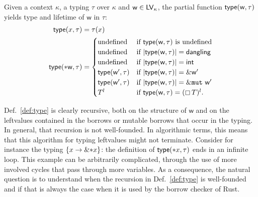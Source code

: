 \begin{definition}\label{def:type}
  Given a context $\kappa$, a typing $\tau$ over $\kappa$
  and $\mathsf{w}\in\mathsf{LV}_\kappa$, the partial function
  $\mathsf{type}(\mathsf{w},\tau)$ yields type and lifetime of $\mathsf{w}$ in $\tau$:
  \begin{align*}
    \mathsf{type}(x,\tau)&=\tau(x)\\
    \mathsf{type}(*\mathsf{w},\tau)&=\begin{cases}
    \text{undefined} & \text{if $\mathsf{type}(\mathsf{w},\tau)$ is undefined}\\
    \text{undefined} & \text{if $|\mathsf{type}(\mathsf{w},\tau)|=\mathsf{dangling}$}\\
    \text{undefined} & \text{if $|\mathsf{type}(\mathsf{w},\tau)|=\mathsf{int}$}\\
    \mathsf{type}(\mathsf{w}',\tau) & \text{if $|\mathsf{type}(\mathsf{w},\tau)|=\&\mathsf{w}'$}\\
    \mathsf{type}(\mathsf{w}',\tau) & \text{if $|\mathsf{type}(\mathsf{w},\tau)|=\&\mathtt{mut}\ \mathsf{w}'$}\\
    T^l & \text{if $\mathsf{type}(\mathsf{w},\tau)=(\boxempty\,{T})^l$.}
    \end{cases}
  \end{align*}
\end{definition}

Def.~\ref{def:type} is clearly recursive, both on the structure of $\mathsf{w}$ and
on the leftvalues contained in the borrows or mutable borrows that occur in the typing.
In general, that recursion is not well-founded. In algorithmic terms, this means
that this algorithm for typing leftvalues might not terminate.
Consider for instance the typing $\{x\to\&\mathtt{*}x\}$:
the definition of $\mathsf{type}(\mathtt{*}x,\tau)$ ends in an infinite loop.
This example can be arbitrarily complicated, through the
use of more involved cycles that pass through more variables. As a consequence,
the natural question is to understand when the recursion in
Def.~\ref{def:type} is well-founded and if that is always the case when it is
used by the borrow checker of Rust.
